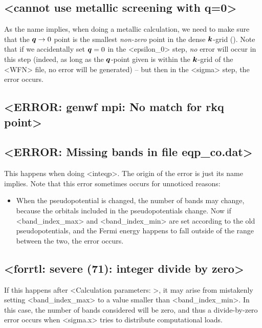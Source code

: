 \documentclass[hyperref, a4paper, 12pt]{report}
\def\texttt#1{<#1>}%
\newcommand{\shortcode}[1]{\texttt{#1}}
\begin{document}
\subsection{\shortcode{cannot use metallic screening with q=0}}

As the name implies, 
when doing a metallic calculation,
we need to make sure that the $\vb*{q} \to 0$ point 
is the smallest \emph{non-zero} point in the dense $\vb*{k}$-grid 
().
Note that if we accidentally set $\vb*{q} = 0$ in the \shortcode{epsilon_0} step, 
\emph{no} error will occur in this step 
(indeed, as long as the $\vb*{q}$-point given is within the $\vb*{k}$-grid of the \shortcode{WFN} file, 
no error will be generated) -- 
but then in the \shortcode{sigma} step, 
the error occurs.

\subsection{\shortcode{ERROR: genwf mpi: No match for rkq point}}

\subsection{\shortcode{ERROR: Missing bands in file eqp_co.dat}}

This happens when doing \shortcode{inteqp}.
The origin of the error is just its name implies.
Note that this error sometimes occurs for unnoticed reasons:
\begin{itemize}
    \item When the pseudopotential is changed, 
    the number of bands may change,
    because the orbitals included in the pseudopotentials change.
    Now if \shortcode{band_index_max} and \shortcode{band_index_min}
    are set according to the old pseudopotentials,
    and the Fermi energy happens to fall outside of the range between the two,
    the error occurs.
\end{itemize}

\subsection{\shortcode{forrtl: severe (71): integer divide by zero}}

If this happens after \shortcode{Calculation parameters: },
it may arise from mistakenly setting \shortcode{band_index_max}
to a value smaller than \shortcode{band_index_min}.
In this case, 
the number of bands considered will be zero,
and thus a divide-by-zero error occurs 
when \shortcode{sigma.x} tries to distribute computational loads.
\end{document}
